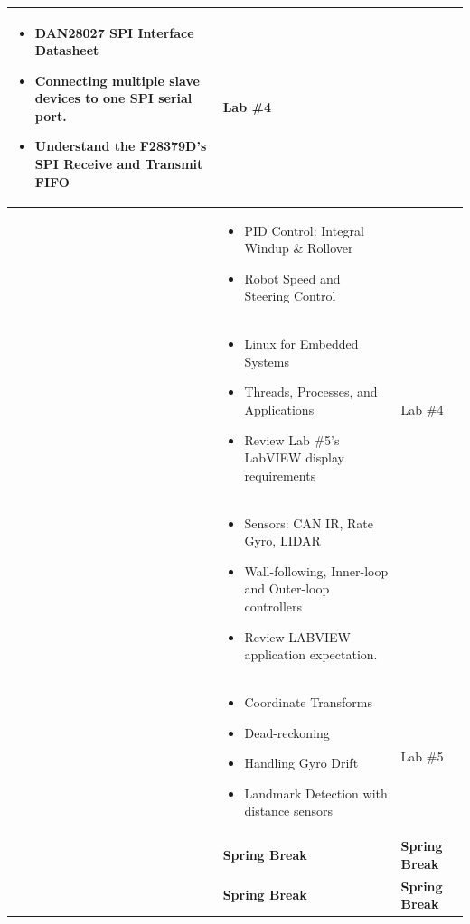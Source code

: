 \documentclass[11pt]{article}
\begin{document}
\begin{longtable}{@{} L{3.5cm} L{8.5cm} L{3.5cm} @{}}
    \begin{itemize}
        \item DAN28027 SPI Interface Datasheet
        \item Connecting multiple slave devices to one SPI serial port.
        \item Understand the F28379D’s SPI Receive and Transmit FIFO
    \end{itemize} & Lab \#4 \\ \midrule
     &
    \begin{itemize}
        \item PID Control: Integral Windup \& Rollover
        \item Robot Speed and Steering Control
    \end{itemize} & \\ \midrule
     &
    \begin{itemize}
        \item Linux for Embedded Systems
        \item Threads, Processes, and Applications
        \item Review Lab \#5’s LabVIEW display requirements
    \end{itemize} & Lab \#4 \\ \midrule
     &
    \begin{itemize}
        \item Sensors: CAN IR, Rate Gyro, LIDAR
        \item Wall-following, Inner-loop and Outer-loop controllers
        \item Review LABVIEW application expectation.
    \end{itemize} & \\ \midrule
     &
    \begin{itemize}
        \item Coordinate Transforms
        \item Dead-reckoning
        \item Handling Gyro Drift
        \item Landmark Detection with distance sensors
    \end{itemize} & Lab \#5 \\ \midrule
      & \textbf{Spring Break} & \textbf{Spring Break} \\ \midrule
      & \textbf{Spring Break} & \textbf{Spring Break} \\ \midrule

\end{longtable}
\end{document}
